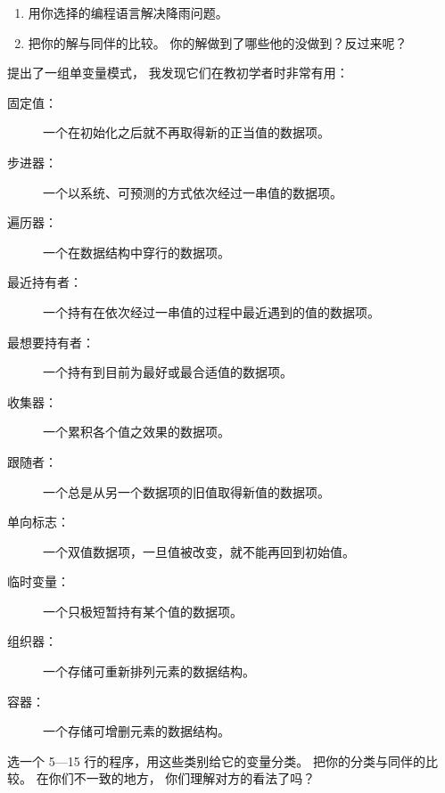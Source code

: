 \begin{enumerate}

\item
  用你选择的编程语言解决降雨问题。

\item
  把你的解与同伴的比较。
  你的解做到了哪些他的没做到？反过来呢？

\end{enumerate}


\cite{Kuit2004,Byck2005,Saja2006}提出了一组单变量模式，
我发现它们在教初学者时非常有用：

\begin{description}

\item[固定值：]
  一个在初始化之后就不再取得新的正当值的数据项。

\item[步进器：]
  一个以系统、可预测的方式依次经过一串值的数据项。

\item[遍历器：]
  一个在数据结构中穿行的数据项。

\item[最近持有者：]
  一个持有在依次经过一串值的过程中最近遇到的值的数据项。

\item[最想要持有者：]
  一个持有到目前为最好或最合适值的数据项。

\item[收集器：]
  一个累积各个值之效果的数据项。

\item[跟随者：]
  一个总是从另一个数据项的旧值取得新值的数据项。

\item[单向标志：]
  一个双值数据项，一旦值被改变，就不能再回到初始值。

\item[临时变量：]
  一个只极短暂持有某个值的数据项。

\item[组织器：]
  一个存储可重新排列元素的数据结构。

\item[容器：]
  一个存储可增删元素的数据结构。

\end{description}

选一个 5—15 行的程序，用这些类别给它的变量分类。
把你的分类与同伴的比较。
在你们不一致的地方，
你们理解对方的看法了吗？


